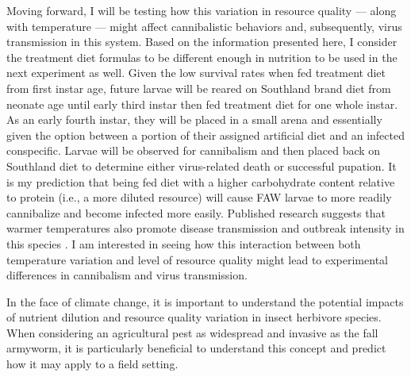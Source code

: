 \documentclass[12pt,]{article}
\begin{document}
Moving forward, I will be testing how this variation in resource quality
--- along with temperature --- might affect cannibalistic behaviors and,
subsequently, virus transmission in this system. Based on the
information presented here, I consider the treatment diet formulas to be
different enough in nutrition to be used in the next experiment as well.
Given the low survival rates when fed treatment diet from first instar
age, future larvae will be reared on Southland brand diet from neonate
age until early third instar then fed treatment diet for one whole
instar. As an early fourth instar, they will be placed in a small arena
and essentially given the option between a portion of their assigned
artificial diet and an infected conspecific. Larvae will be observed for
cannibalism and then placed back on Southland diet to determine either
virus-related death or successful pupation. It is my prediction that
being fed diet with a higher carbohydrate content relative to protein
(i.e., a more diluted resource) will cause FAW larvae to more readily
cannibalize and become infected more easily. Published research suggests
that warmer temperatures also promote disease transmission and outbreak
intensity in this species \autocite{elderd_warmer_2014}. I am interested
in seeing how this interaction between both temperature variation and
level of resource quality might lead to experimental differences in
cannibalism and virus transmission.

In the face of climate change, it is important to understand the
potential impacts of nutrient dilution and resource quality variation in
insect herbivore species. When considering an agricultural pest as
widespread and invasive as the fall armyworm, it is particularly
beneficial to understand this concept and predict how it may apply to a
field setting.





\newpage
\singlespacing 
\printbibliography[title=Literature Cited]
\end{document}
